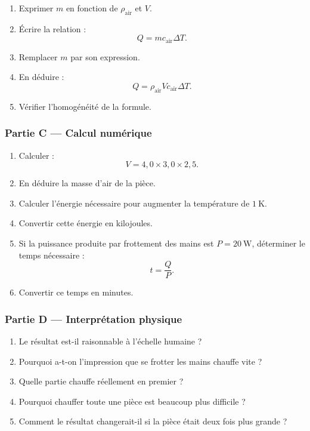\documentclass[11pt,a4paper]{article}
\begin{document}
\begin{enumerate}
  \item Exprimer \(m\) en fonction de \(\rho_{\mathrm{air}}\) et \(V\).
  \item Écrire la relation :
  \[
  Q=mc_{\mathrm{air}}\Delta T.
  \]
  \item Remplacer \(m\) par son expression.
  \item En déduire :
  \[
  Q=\rho_{\mathrm{air}}Vc_{\mathrm{air}}\Delta T.
  \]
  \item Vérifier l'homogénéité de la formule.
\end{enumerate}

\subsubsection*{Partie C — Calcul numérique}

\begin{enumerate}
  \item Calculer :
  \[
  V=4{,}0\times 3{,}0\times 2{,}5.
  \]
  \item En déduire la masse d'air de la pièce.
  \item Calculer l'énergie nécessaire pour augmenter la température de \(1\ \mathrm K\).
  \item Convertir cette énergie en kilojoules.
  \item Si la puissance produite par frottement des mains est \(P=20\ \mathrm W\), déterminer le temps nécessaire :
  \[
  t=\frac{Q}{P}.
  \]
  \item Convertir ce temps en minutes.
\end{enumerate}

\subsubsection*{Partie D — Interprétation physique}

\begin{enumerate}
  \item Le résultat est-il raisonnable à l'échelle humaine ?
  \item Pourquoi a-t-on l'impression que se frotter les mains chauffe vite ?
  \item Quelle partie chauffe réellement en premier ?
  \item Pourquoi chauffer toute une pièce est beaucoup plus difficile ?
  \item Comment le résultat changerait-il si la pièce était deux fois plus grande ?
\end{enumerate}
\end{document}
